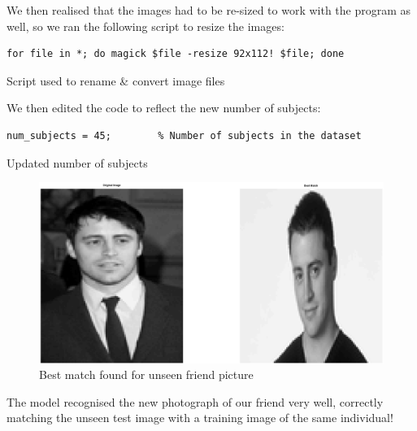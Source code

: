\documentclass[a4paper]{article}
\newenvironment{code}{\captionsetup{type=listing}}{}
\begin{document}
We then realised that the images had to be re-sized to work with the program as well, so we ran the following script to resize the images:
\begin{code}
\begin{verbatim}
for file in *; do magick $file -resize 92x112! $file; done 
\end{verbatim}
\caption{Script used to rename \& convert image files}
\end{code}

We then edited the code to reflect the new number of subjects:
\begin{code}
\begin{verbatim}
num_subjects = 45;        % Number of subjects in the dataset
\end{verbatim}
\caption{Updated number of subjects}
\end{code}

\begin{figure}[H]
    \centering
    \includegraphics[width=\textwidth]{./images/fwend.png}
    \caption{ Best match found for unseen friend picture }
\end{figure}

The model recognised the new photograph of our friend very well, correctly matching the unseen test image with a training image of the same individual! 
\end{document}
